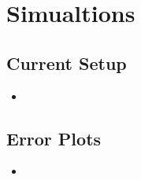 \chapter{Simualtions}\label{ch:simulations}


\section{Current Setup}
\begin{itemize}
    \item
\end{itemize}

\section{Error Plots}
\begin{itemize}
    \item
\end{itemize}







